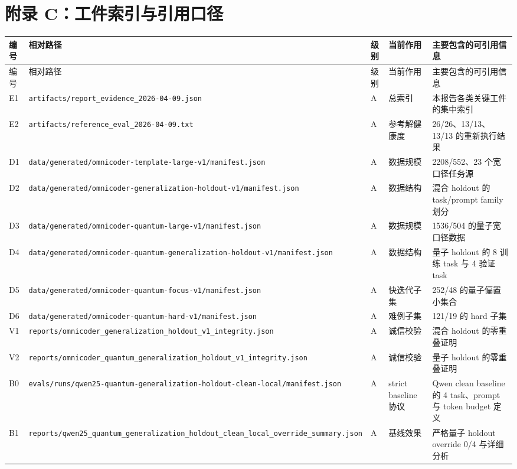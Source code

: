 \documentclass[11pt,a4paper]{article}
\newcommand{\code}[1]{\begingroup\ttfamily\footnotesize\nolinkurl{#1}\endgroup}
\begin{document}
\clearpage

\section{附录 C：工件索引与引用口径}

\small
\begin{longtable}{p{0.9cm} T{5.1cm} p{0.8cm} p{1.6cm} p{5.4cm}}
\toprule
编号 & 相对路径 & 级别 & 当前作用 & 主要包含的可引用信息 \\
\midrule
\endfirsthead
\toprule
编号 & 相对路径 & 级别 & 当前作用 & 主要包含的可引用信息 \\
\midrule
\endhead
E1 & \code{artifacts/report_evidence_2026-04-09.json} & A & 总索引 & 本报告各类关键工件的集中索引 \\
E2 & \code{artifacts/reference_eval_2026-04-09.txt} & A & 参考解健康度 & 26/26、13/13、13/13 的重新执行结果 \\
D1 & \code{data/generated/omnicoder-template-large-v1/manifest.json} & A & 数据规模 & 2208/552、23 个宽口径任务源 \\
D2 & \code{data/generated/omnicoder-generalization-holdout-v1/manifest.json} & A & 数据结构 & 混合 holdout 的 task/prompt family 划分 \\
D3 & \code{data/generated/omnicoder-quantum-large-v1/manifest.json} & A & 数据规模 & 1536/504 的量子宽口径数据 \\
D4 & \code{data/generated/omnicoder-quantum-generalization-holdout-v1/manifest.json} & A & 数据结构 & 量子 holdout 的 8 训练 task 与 4 验证 task \\
D5 & \code{data/generated/omnicoder-quantum-focus-v1/manifest.json} & A & 快迭代子集 & 252/48 的量子偏置小集合 \\
D6 & \code{data/generated/omnicoder-quantum-hard-v1/manifest.json} & A & 难例子集 & 121/19 的 hard 子集 \\
V1 & \code{reports/omnicoder_generalization_holdout_v1_integrity.json} & A & 诚信校验 & 混合 holdout 的零重叠证明 \\
V2 & \code{reports/omnicoder_quantum_generalization_holdout_v1_integrity.json} & A & 诚信校验 & 量子 holdout 的零重叠证明 \\
B0 & \code{evals/runs/qwen25-quantum-generalization-holdout-clean-local/manifest.json} & A & strict baseline 协议 & Qwen clean baseline 的 4 task、prompt 与 token budget 定义 \\
B1 & \code{reports/qwen25_quantum_generalization_holdout_clean_local_override_summary.json} & A & 基线效果 & 严格量子 holdout override 0/4 与详细分析 \\

\end{longtable}
\end{document}
